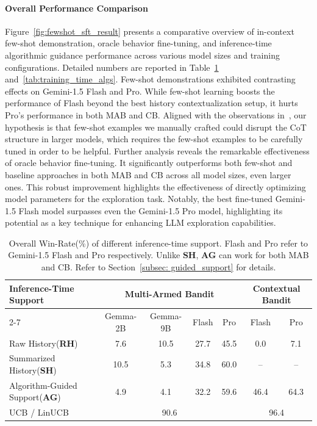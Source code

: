 \documentclass[11pt, logo]{googledeepmind}
\newcommand{\SH}{\textbf{SH}\xspace}
\newcommand{\RH}{\textbf{RH}\xspace}
\newcommand{\AG}{\textbf{AG}\xspace}
\newcommand{\AWR}{Overall Win-Rate\xspace}
\newcommand{\ag}{Algorithm-Guided Support\xspace}
\newcommand{\rah}{Raw History\xspace}
\newcommand{\sh}{Summarized History\xspace}
\theoremstyle{plain}
\theoremstyle{definition}
\begin{document}
\paragraph{Overall Performance Comparison}
Figure~\ref{fig:fewshot_sft_result} presents a comparative overview of in-context few-shot demonstration, oracle behavior fine-tuning, and inference-time algorithmic guidance performance across various model sizes and training configurations. Detailed numbers are reported in Table~\ref{tab:inference_time_algs} and~\ref{tab:training_time_algs}.
Few-shot demonstrations exhibited contrasting effects on Gemini-1.5 Flash and Pro. While few-shot learning boosts the performance of Flash beyond the best history contextualization setup, it hurts Pro's performance in both MAB and CB. Aligned with the observations in~\citet{zheng2024natural,guo2025deepseek}, our hypothesis is that few-shot examples we manually crafted could disrupt the CoT structure in larger models, which requires the few-shot examples to be carefully tuned in order to be helpful.
Further analysis reveals the remarkable effectiveness of oracle behavior fine-tuning. It significantly outperforms both few-shot and baseline approaches in both MAB and CB across all model sizes, even larger ones.
This robust improvement highlights the effectiveness of directly optimizing model parameters for the exploration task. Notably, the best fine-tuned Gemini-1.5 Flash model surpasses even the Gemini-1.5 Pro model, highlighting its potential as a key technique for enhancing LLM exploration capabilities.
\begin{table}[]
\small
\centering
\begin{tabular}{@{}lcccc|cc@{}}
\toprule
\multirow{2}{*}{Inference-Time Support}  & \multicolumn{4}{c}{\textbf{Multi-Armed Bandit}} & \multicolumn{2}{c}{\textbf{Contextual Bandit}} \\ \cmidrule(l){2-7}
                 & Gemma-2B & Gemma-9B      & Flash   & Pro  & Flash   & Pro   \\ \midrule
\rah (\RH)          & 7.6 & 10.5       & 27.7              & 45.5           & 0.0                 & 7.1            \\
\sh (\SH)  & 10.5 & 5.3         & 34.8              & 60.0           & --                 & --               \\
\ag (\AG)  & 4.9 &  4.1         & 32.2              & 59.6           & 46.4              & 64.3            \\ \midrule
UCB / LinUCB & \multicolumn{4}{c|}{90.6} & \multicolumn{2}{c}{96.4}  \\
\bottomrule
\end{tabular}
\caption{\footnotesize{\AWR (\%) of different inference-time support. Flash and Pro refer to Gemini-1.5 Flash and Pro respectively. Unlike \SH, \AG can work for both MAB and CB. Refer to Section~\ref{subsec: guided_support} for details.}}
\label{tab:inference_time_algs}
\vspace{-0.2cm}
\end{table}
\end{document}
